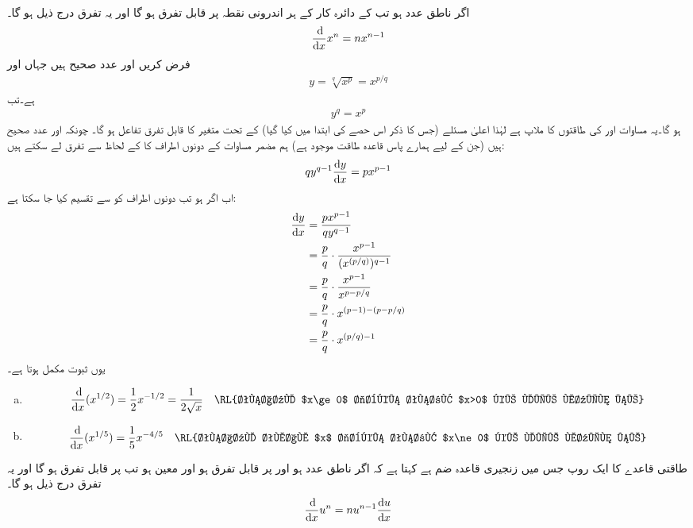 \\
اگر  ناطق عدد ہو تب  کے دائرہ کار کے ہر اندرونی نقطہ  پر  قابل تفرق ہو گا اور یہ تفرق درج ذیل ہو گا۔
\begin{align*}
\frac{\dif}{\dif x}x^n=nx^{n-1}
\end{align*}
فرض کریں  اور  عدد صحیح ہیں جہاں  اور  
\begin{align*}
y=\sqrt[q]{x^p}=x^{p/q}
\end{align*}
ہے۔تب 
\begin{align*}
y^q=x^p
\end{align*}
ہو گا۔یہ مساوات  اور  کی طاقتوں کا ملاپ ہے لہٰذا   اعلیٰ مسئلے (جس کا ذکر اس  حصے کی  ابتدا میں کیا گیا)  کے تحت  متغیر  کا قابل تفرق تفاعل ہو گا۔ چونکہ  اور  عدد صحیح ہیں (جن کے لیے ہمارے پاس قاعدہ طاقت موجود  ہے) ہم مضمر مساوات کے دونوں اطراف کا  کے لحاظ سے تفرق لے سکتے ہیں:
\begin{align*}
qy^{q-1}\frac{\dif y}{\dif x}=px^{p-1}
\end{align*} 
اب اگر  ہو تب دونوں اطراف کو  سے تقسیم کیا جا سکتا ہے:
\begin{align*}
\frac{\dif y}{\dif x}&=\frac{px^{p-1}}{qy^{q-1}}\\
&=\frac{p}{q}\cdot\frac{x^{p-1}}{(x^{(p/q)})^{q-1}}\\
&=\frac{p}{q}\cdot \frac{x^{p-1}}{x^{p-p/q}}\\
&=\frac{p}{q}\cdot x^{(p-1)-(p-p/q)}\\
&=\frac{p}{q}\cdot x^{{(p/q)-1}}
\end{align*}
یوں ثبوت مکمل ہوتا ہے۔
\begin{enumerate}[a.]

\item
\begin{align*}
\frac{\dif}{\dif x}(x^{1/2})=\frac{1}{2}x^{-1/2}=\frac{1}{2\sqrt{x}} &&\text{\RL{تفاعل $x\ge 0$  جبکہ تفرق $x>0$ کے لیے معین ہے}}
\end{align*}
\item
\begin{align*}
\frac{\dif}{\dif x}(x^{1/5})=\frac{1}{5}x^{-4/5}&&\text{\RL{تفاعل تمام $x$ جبکہ تفرق $x\ne 0$ کے لیے معین ہے}}
\end{align*}
\end{enumerate}
طاقتی قاعدے کا ایک روپ جس میں زنجیری قاعدہ ضم ہے کہتا ہے کہ اگر  ناطق عدد ہو اور  پر  قابل تفرق ہو اور  معین ہو تب  پر  قابل تفرق ہو گا اور یہ تفرق درج ذیل ہو گا۔
\begin{align}
\frac{\dif}{\dif x} u^n=nu^{n-1}\frac{\dif u}{\dif x}
\end{align} 

